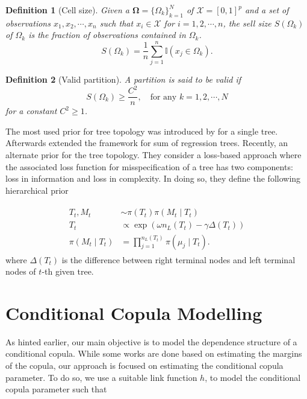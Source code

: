 \documentclass{amsart}
\newtheorem{definition}{Definition}[section]
\begin{document}
\begin{definition}[Cell size] Given a $\mathbf{\Omega} = \{\Omega_k\}_{k=1}^N$ of $\mathcal{X} = [0,1]^p$ and a set of observations $x_1, x_2, \cdots, x_n$ such that $x_i\in \mathcal{X}$ for $i=1,2,\cdots, n$, the sell size $S(\Omega_k)$ of $\Omega_k$
	is the fraction of observations contained in $\Omega_k$.
	\begin{equation*}
		S(\Omega_k) = \frac{1}{n}\sum_{j=1}^n \mathbb{I}(x_j\in \Omega_k).
	\end{equation*}
\end{definition}

\begin{definition}[Valid partition]
	A partition is said to be valid if
	\begin{equation*}
		S(\Omega_k) \ge \frac{C^2}{n}, \quad\text{for any } k=1,2,\cdots, N
	\end{equation*}
	for a constant $C^2\ge 1$.
\end{definition}

The most used prior for tree topology was introduced by \citet{chipman98BCART} for a single tree. Afterwards \citet{chipman2010BART} extended the framework for sum of regression trees. Recently, \citet{serafini2024lossbasedpriortreetopologies} an alternate prior for the tree topology. They consider a loss-based approach \cite{villa_loss-prior} where the associated loss function for misspecification of a tree has two components: loss in information and loss in complexity. In doing so, they define the following hierarchical prior

\begin{align}
	\begin{split}
		T_t, M_t &\sim \pi(T_t)\pi(M_t\mid T_t)\\
		T_t &\propto \exp\left(\omega n_L(T_t)-\gamma\Delta(T_t)\right)\\
		\pi(M_t\mid T_t) & = \prod_{j=1}^{n_L(T_t)}\pi(\mu_j\mid T_t).
	\end{split}
\end{align}
where $\Delta(T_t)$ is the difference between right terminal nodes and left terminal nodes of $t$-th given tree.


\section{Conditional Copula Modelling}\label{sec:cond:cop}

As hinted earlier, our main objective is to model the dependence structure of a conditional copula. While some works are done based on estimating the margins of the copula, our approach is focused on estimating the conditional copula parameter. To do so, we use a suitable link function $h$, to model the conditional copula parameter such that 
\end{document}
